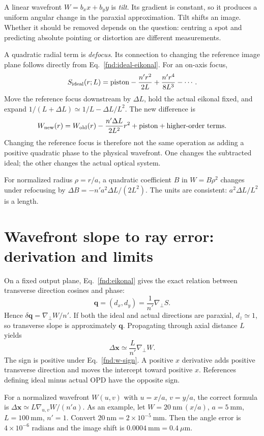 A linear wavefront $W=b_xx+b_yy$ is \emph{tilt}. Its gradient is constant, so it produces a uniform angular change in the paraxial approximation. Tilt shifts an image. Whether it should be removed depends on the question: centring a spot and predicting absolute pointing or distortion are different measurements.

A quadratic radial term is \emph{defocus}. Its connection to changing the reference image plane follows directly from Eq.~\eqref{fnd:ideal-eikonal}. For an on-axis focus,
\[
S_{\rm ideal}(r;L)=\text{piston}-\frac{n'r^2}{2L}
+\frac{n'r^4}{8L^3}-\cdots.
\]
Move the reference focus downstream by $\Delta L$, hold the actual eikonal fixed, and expand $1/(L+\Delta L)\simeq1/L-\Delta L/L^2$. The new difference is
\begin{equation}
W_{\rm new}(r)=W_{\rm old}(r)
-\frac{n'\Delta L}{2L^2}r^2
+\text{piston}+\text{higher-order terms}.
\label{fnd:reference-focus-shift}
\end{equation}
Changing the reference focus is therefore not the same operation as adding a positive quadratic phase to the physical wavefront. One changes the subtracted ideal; the other changes the actual optical system.

For normalized radius $\rho=r/a$, a quadratic coefficient $B$ in $W=B\rho^2$ changes under refocusing by $\Delta B=-n'a^2\Delta L/(2L^2)$. The units are consistent: $a^2\Delta L/L^2$ is a length.

\section{Wavefront slope to ray error: derivation and limits}
On a fixed output plane, Eq.~\eqref{fnd:eikonal} gives the exact relation between transverse direction cosines and phase:
\[
\bm{q}=(d_x,d_y)=\frac1{n'}\nabla_\perp S.
\]
Hence $\delta\bm{q}=\nabla_\perp W/n'$. If both the ideal and actual directions are paraxial, $d_z\simeq1$, so transverse slope is approximately $\bm{q}$. Propagating through axial distance $L$ yields
\begin{equation}
\boxed{\Delta\bm{x}\simeq\frac{L}{n'}\nabla_\perp W.}
\label{fnd:raygradient}
\end{equation}
The sign is positive under Eq.~\eqref{fnd:w-sign}. A positive $x$ derivative adds positive transverse direction and moves the intercept toward positive $x$. References defining ideal minus actual OPD have the opposite sign.

For a normalized wavefront $W(u,v)$ with $u=x/a$, $v=y/a$, the correct formula is $\Delta\bm{x}\simeq L\nabla_{u,v}W/(n'a)$. As an example, let $W=20\ \mathrm{nm}\,(x/a)$, $a=5\ \mathrm{mm}$, $L=100\ \mathrm{mm}$, $n'=1$. Convert $20\ \mathrm{nm}=2\times10^{-5}\ \mathrm{mm}$. Then the angle error is $4\times10^{-6}$ radians and the image shift is $0.0004\ \mathrm{mm}=0.4\ \mu\mathrm{m}$.


